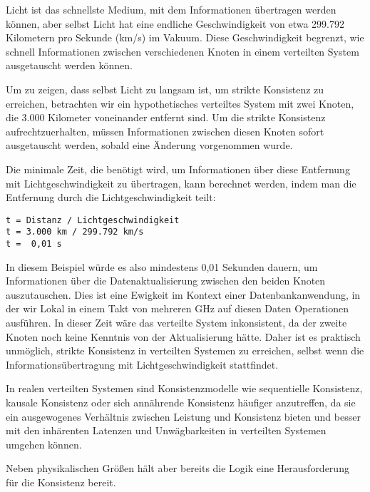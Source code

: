 Licht ist das schnellste Medium, mit dem Informationen übertragen werden können, aber selbst Licht hat eine endliche Geschwindigkeit von etwa 299.792 Kilometern pro Sekunde (km/s) im Vakuum. Diese Geschwindigkeit begrenzt, wie schnell Informationen zwischen verschiedenen Knoten in einem verteilten System ausgetauscht werden können.

Um zu zeigen, dass selbst Licht zu langsam ist, um strikte Konsistenz zu erreichen, betrachten wir ein hypothetisches verteiltes System mit zwei Knoten, die 3.000 Kilometer voneinander entfernt sind. Um die strikte Konsistenz aufrechtzuerhalten, müssen Informationen zwischen diesen Knoten sofort ausgetauscht werden, sobald eine Änderung vorgenommen wurde.

Die minimale Zeit, die benötigt wird, um Informationen über diese Entfernung mit Lichtgeschwindigkeit zu übertragen, kann berechnet werden, indem man die Entfernung durch die Lichtgeschwindigkeit teilt:
\begin{lstlisting}[caption={Berechnung Lichtgeschwindigkeit},captionpos=b,label={lst:licht}]
t = Distanz / Lichtgeschwindigkeit
t = 3.000 km / 299.792 km/s
t =  0,01 s
\end{lstlisting}
In diesem Beispiel würde es also mindestens 0,01 Sekunden dauern, um Informationen über die Datenaktualisierung zwischen den beiden Knoten auszutauschen. Dies ist eine Ewigkeit im Kontext einer Datenbankanwendung, in der wir Lokal in einem Takt von mehreren GHz auf diesen Daten Operationen ausführen. In dieser Zeit wäre das verteilte System inkonsistent, da der zweite Knoten noch keine Kenntnis von der Aktualisierung hätte. Daher ist es praktisch unmöglich, strikte Konsistenz in verteilten Systemen zu erreichen, selbst wenn die Informationsübertragung mit Lichtgeschwindigkeit stattfindet.

In realen verteilten Systemen sind Konsistenzmodelle wie sequentielle Konsistenz, kausale Konsistenz oder sich annährende Konsistenz häufiger anzutreffen, da sie ein ausgewogenes Verhältnis zwischen Leistung und Konsistenz bieten und besser mit den inhärenten Latenzen und Unwägbarkeiten in verteilten Systemen umgehen können.

Neben physikalischen Größen hält aber bereits die Logik eine Herausforderung für die Konsistenz  bereit. 

